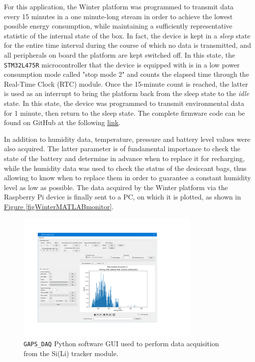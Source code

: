 \par
For this application, the Winter platform was programmed to transmit data every 15 minutes in a one minute-long stream in order to achieve the lowest possible energy consumption, while maintaining a sufficiently representative statistic of the internal state of the box. In fact, the device is kept in a \textit{sleep} state for the entire time interval during the course of which no data is transmitted, and all peripherals on board the platform are kept switched off. In this state, the \texttt{STM32L475R} microcontroller that the device is equipped with is in a low power consumption mode called "stop mode 2" and counts the elapsed time through the Real-Time Clock (RTC) module. Once the 15-minute count is reached, the latter is used as an interrupt to bring the platform back from the sleep state to the \textit{idle} state. In this state, the device was programmed to transmit environmental data for 1 minute, then return to the sleep state. The complete firmware code can be found on GitHub at the following \href{https://github.com/lucaghislo/winterGAPS/tree/main}{\underline{link}}.

\par
In addition to humidity data, temperature, pressure and battery level values were also acquired. The latter parameter is of fundamental importance to check the state of the battery and determine in advance when to replace it for recharging, while the humidity data was used to check the status of the desiccant bags, thus allowing to know when to replace them in order to guarantee a constant humidity level as low as possible. The data acquired by the Winter platform via the Raspberry Pi device is finally sent to a PC, on which it is plotted, as shown in \hyperref[figWinterMATLABmonitor]{Figure \ref{figWinterMATLABmonitor}}.

\begin{figure}[h!]
    \centering
    \includegraphics[width=0.8\textwidth]{Images/chap3/GAPS_DAQ.pdf}
    \caption{\texttt{GAPS\_DAQ} Python software GUI used to perform data acquisition from the Si(Li) tracker module.}
    \label{figGapsDAQpy}
\end{figure}

